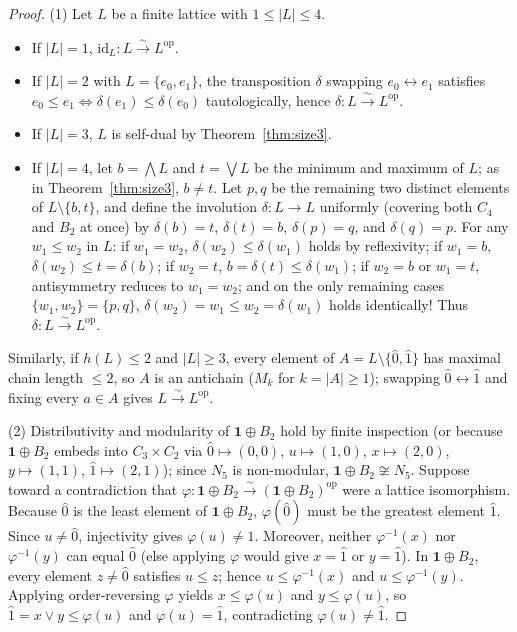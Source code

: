 \documentclass[11pt]{article}
\theoremstyle{definition}
\newcommand{\op}{\mathrm{op}}
\begin{document}
\begin{proof}
(1) Let $L$ be a finite lattice with $1 \le |L| \le 4$.
\begin{itemize}
  \item If $|L| = 1$, $\mathrm{id}_L : L \xrightarrow{\sim} L^{\op}$.
  \item If $|L| = 2$ with $L = \{e_0, e_1\}$, the transposition $\delta$ swapping
  $e_0 \leftrightarrow e_1$ satisfies $e_0 \le e_1 \iff \delta(e_1) \le
  \delta(e_0)$ tautologically, hence $\delta : L \xrightarrow{\sim} L^{\op}$.
  \item If $|L| = 3$, $L$ is self-dual by Theorem~\ref{thm:size3}.
  \item If $|L| = 4$, let $b = \bigwedge L$ and $t = \bigvee L$ be the minimum
  and maximum of $L$; as in Theorem~\ref{thm:size3}, $b \ne t$. Let $p, q$ be the
  remaining two distinct elements of $L \setminus \{b, t\}$, and define the
  involution $\delta : L \to L$ uniformly (covering both $C_4$ and $B_2$ at once)
  by $\delta(b) = t$, $\delta(t) = b$, $\delta(p) = q$, and $\delta(q) = p$. For
  any $w_1 \le w_2$ in $L$: if $w_1 = w_2$, $\delta(w_2) \le \delta(w_1)$ holds
  by reflexivity; if $w_1 = b$, $\delta(w_2) \le t = \delta(b)$; if $w_2 = t$,
  $b = \delta(t) \le \delta(w_1)$; if $w_2 = b$ or $w_1 = t$, antisymmetry
  reduces to $w_1 = w_2$; and on the only remaining cases $\{w_1, w_2\} = \{p, q\}$,
  $\delta(w_2) = w_1 \le w_2 = \delta(w_1)$ holds identically! Thus
  $\delta : L \xrightarrow{\sim} L^{\op}$.
\end{itemize}
Similarly, if $h(L) \le 2$ and $|L| \ge 3$, every element of
$A = L \setminus \{\hat{0}, \hat{1}\}$ has maximal chain length $\le 2$, so $A$
is an antichain ($M_k$ for $k = |A| \ge 1$); swapping $\hat{0} \leftrightarrow
\hat{1}$ and fixing every $a \in A$ gives $L \xrightarrow{\sim} L^{\op}$.

(2) Distributivity and modularity of $\mathbf{1} \oplus B_2$ hold by finite
inspection (or because $\mathbf{1} \oplus B_2$ embeds into $C_3 \times C_2$ via
$\hat{0} \mapsto (0,0)$, $u \mapsto (1,0)$, $x \mapsto (2,0)$, $y \mapsto (1,1)$,
$\hat{1} \mapsto (2,1)$); since $N_5$ is non-modular, $\mathbf{1} \oplus B_2
\not\cong N_5$. Suppose toward a contradiction that $\varphi : \mathbf{1} \oplus
B_2 \xrightarrow{\sim} (\mathbf{1} \oplus B_2)^{\op}$ were a lattice isomorphism.
Because $\hat{0}$ is the least element of $\mathbf{1} \oplus B_2$,
$\varphi(\hat{0})$ must be the greatest element $\hat{1}$. Since $u \ne \hat{0}$,
injectivity gives $\varphi(u) \ne \hat{1}$. Moreover, neither $\varphi^{-1}(x)$
nor $\varphi^{-1}(y)$ can equal $\hat{0}$ (else applying $\varphi$ would give
$x = \hat{1}$ or $y = \hat{1}$). In $\mathbf{1} \oplus B_2$, every element
$z \ne \hat{0}$ satisfies $u \le z$; hence $u \le \varphi^{-1}(x)$ and
$u \le \varphi^{-1}(y)$. Applying order-reversing $\varphi$ yields
$x \le \varphi(u)$ and $y \le \varphi(u)$, so $\hat{1} = x \vee y \le \varphi(u)$
and $\varphi(u) = \hat{1}$, contradicting $\varphi(u) \ne \hat{1}$.
\end{proof}
\end{document}
